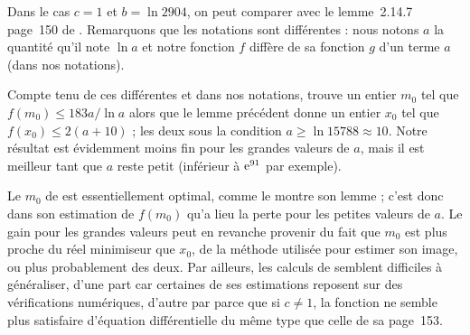 \begin{rem}
  Dans le cas \( c = 1 \) et \( b = \ln 2904 \), on peut comparer avec le
  lemme~2.14.7 page~150 de \cite{farhith}. Remarquons que les notations sont
  différentes : nous notons \( a \) la quantité qu'il note \( \ln a \) et
  notre fonction \( f \) diffère de sa fonction \( g \) d'un terme \( a \)
  (dans nos notations).

  Compte tenu de ces différentes et dans nos notations,  trouve un
  entier \( m_0 \) tel que \( f(m_0) \le 183 a / \ln a \) alors que le lemme
  précédent donne un entier \( x_0 \) tel que \( f(x_0) \le 2 (a + 10) \) ;
  les deux sous la condition \( a \ge \ln 15788 \approx 10 \).  Notre résultat
  est évidemment moins fin pour les grandes valeurs de \( a \), mais il est
  meilleur tant que \( a \) reste petit (inférieur à \( \mathrm e^{91} \) par
  exemple).

  Le \( m_0 \) de  est essentiellement optimal, comme le montre son
  lemme ; c'est donc dans son estimation de \( f(m_0) \) qu'a lieu la perte
  pour les petites valeurs de \( a \). Le gain pour les grandes valeurs peut
  en revanche provenir du fait que \( m_0 \) est plus proche du réel
  minimiseur que \( x_0 \), de la méthode utilisée pour estimer son image, ou
  plus probablement des deux. Par ailleurs, les calculs de 
  semblent difficiles à généraliser, d'une part car certaines de ses
  estimations reposent sur des vérifications numériques, d'autre par parce que
  si \( c \neq 1 \), la fonction ne semble plus satisfaire d'équation
  différentielle du même type que celle de sa page~153.
\end{rem}

